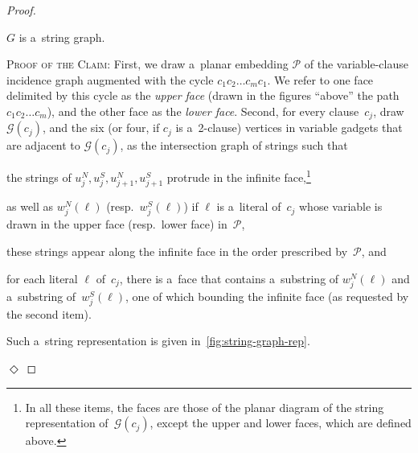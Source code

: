 \documentclass[a4paper,UKenglish,cleveref,autoref]{lipics-v2021}
\newenvironment{proofofclaim}{\noindent \textsc{Proof of the Claim:}}{\unskip\nobreak\hfill$\Diamond$\medskip}
\begin{document}
\begin{proof}
 \begin{claim}\label{clm:G-string-graph}
   $G$ is a~string graph.
 \end{claim}
 \begin{proofofclaim}
 First, we draw a~planar embedding $\mathcal P$ of the variable-clause incidence graph augmented with the cycle $c_1c_2 \ldots c_mc_1$.
 We refer to one face delimited by this cycle as the \emph{upper face} (drawn in the figures ``above'' the path $c_1c_2 \ldots c_m$), and the other face as the \emph{lower face}. 
 Second, for every clause~$c_j$, draw $\mathcal G(c_j)$, and the six (or four, if $c_j$ is a~2-clause) vertices in variable gadgets that are adjacent to $\mathcal G(c_j)$, as the intersection graph of strings such that
 \begin{compactitem}
 \item the strings of $u^N_j, u^S_j, u^N_{j+1}, u^S_{j+1}$ protrude in the infinite face,\footnote{In all these items, the faces are those of the planar diagram  of the string representation of~$\mathcal G(c_j)$, except the upper and lower faces, which are defined above.}
 \item as well as $w^N_j(\ell)$ (resp.~$w^S_j(\ell)$) if $\ell$ is a~literal of~$c_j$ whose variable is drawn in the upper face (resp.~lower face) in~$\mathcal P$,
 \item these strings appear along the infinite face in the order prescribed by~$\mathcal P$, and
 \item for each literal $\ell$ of~$c_j$, there is a~face that contains a~substring of $w^N_j(\ell)$ and a~substring of~$w^S_j(\ell)$, one of which bounding the infinite face (as requested by the second item).
 \end{compactitem}
 Such a~string representation is given in~\cref{fig:string-graph-rep}.

 \begin{figure}[h!]
   \centering
\end{figure}
\end{proofofclaim}
\end{proof}
\end{document}
